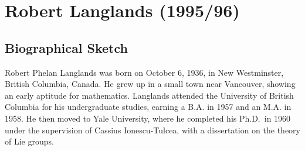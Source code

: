 \let\R\relax
\newcommand{\R}{\mathbb{R}}
\let\C\relax
\newcommand{\C}{\mathbb{C}}
\let\N\relax
\newcommand{\N}{\mathbb{N}}
\let\Z\relax
\newcommand{\Z}{\mathbb{Z}}
\let\Q\relax
\newcommand{\Q}{\mathbb{Q}}
\let\F\relax
\newcommand{\F}{\mathbb{F}}
\let\A\relax
\newcommand{\A}{\mathbb{A}}
\let\G\relax
\newcommand{\G}{\mathbb{G}}
\let\SO\relax
\newcommand{\SO}{\operatorname{SO}}
\let\SL\relax
\newcommand{\SL}{\operatorname{SL}}
\let\GL\relax
\newcommand{\GL}{\operatorname{GL}}
\let\St\relax
\newcommand{\St}{\operatorname{St}}
\let\GV\relax
\newcommand{\GV}{\operatorname{GV}}
\let\E\relax
\newcommand{\E}{\operatorname{E}}
\let\Gal\relax
\newcommand{\Gal}{\operatorname{Gal}}
\let\PGL\relax
\newcommand{\PGL}{\operatorname{PGL}}
\let\PSL\relax
\newcommand{\PSL}{\operatorname{PSL}}
\let\Sp\relax
\newcommand{\Sp}{\operatorname{Sp}}
\let\SU\relax
\newcommand{\SU}{\operatorname{SU}}
\let\Aut\relax
\newcommand{\Aut}{\operatorname{Aut}}
\let\Ad\relax
\newcommand{\Ad}{\operatorname{Ad}}
\let\ad\relax
\newcommand{\ad}{\operatorname{ad}}
\let\Ind\relax
\newcommand{\Ind}{\operatorname{Ind}}
\let\cInd\relax
\newcommand{\cInd}{\operatorname{cInd}}
\let\Hom\relax
\newcommand{\Hom}{\operatorname{Hom}}
\let\End\relax
\newcommand{\End}{\operatorname{End}}
\let\Spec\relax
\newcommand{\Spec}{\operatorname{Spec}}
\let\Sht\relax
\newcommand{\Sht}{\operatorname{Sht}}
\let\Bun\relax
\newcommand{\Bun}{\operatorname{Bun}}
\let\Coh\relax
\newcommand{\Coh}{\operatorname{Coh}}
\let\Gr\relax
\newcommand{\Gr}{\operatorname{Gr}}
\let\Perv\relax
\newcommand{\Perv}{\operatorname{Perv}}
\let\Rep\relax
\newcommand{\Rep}{\operatorname{Rep}}

\chapter{Robert Langlands (1995/96)}

\section{Biographical Sketch}

Robert Phelan Langlands was born on October 6, 1936, in New Westminster, British Columbia, Canada. He grew up in a small town near Vancouver, showing an early aptitude for mathematics. Langlands attended the University of British Columbia for his undergraduate studies, earning a B.A. in 1957 and an M.A. in 1958. He then moved to Yale University, where he completed his Ph.D.\ in 1960 under the supervision of Cassius Ionescu-Tulcea, with a dissertation on the theory of Lie groups.

